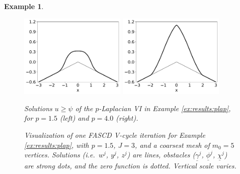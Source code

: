\documentclass[letterpaper,final,12pt,reqno]{amsart}
\theoremstyle{cstyle}
\theoremstyle{cstyle*}
\theoremstyle{dstyle}
\newtheorem{example}[theorem]{Example}
\numberwithin{equation}{section}
\numberwithin{figure}{section}
\numberwithin{table}{section}
\numberwithin{theorem}{section}
\begin{document}
\begin{example}
\begin{figure}[ht]
\begin{center}
\includegraphics[width=0.45\textwidth]{fixfigs/plap1d1p5.pdf} \quad
\includegraphics[width=0.45\textwidth]{fixfigs/plap1d4p0.pdf}
\end{center}
\caption{Solutions $u\ge \psi$ of the $p$-Laplacian VI in Example \ref{ex:results:plap}, for $p=1.5$ (left) and $p=4.0$ (right).}
\label{fig:results:plap}
\end{figure}

\begin{figure}[ht]
\begin{center}

\end{center}
\caption{Visualization of one FASCD V-cycle iteration for Example \ref{ex:results:plap}, with $p=1.5$, $J=3$, and a coarsest mesh of $m_0=5$ vertices.  Solutions (i.e.~$w^j$, $y^j$, $z^j$) are lines, obstacles ($\underline{\gamma}^j$, $\underline{\phi}^j$, $\underline{\chi}^j$) are strong dots, and the zero function is dotted.  Vertical scale varies.}
\label{fig:imagesvcycle}
\end{figure}


\end{example}
\end{document}
